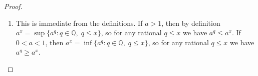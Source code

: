 \begin{proof}
\begin{enumerate}
    For $0 < a < 1$, write $a = (a^{-1})^{-1}$ and apply the previous case to base $a^{-1} > 1$:
    $$a^x = (a^{-1})^{-x} > (a^{-1})^{-y} = a^y$$
    since $-x > -y$ and base $a^{-1} > 1$.

    \item This is immediate from the definitions. If $a > 1$, then by definition $a^x = \sup\{a^q : q \in \mathbb{Q},\; q \leq x\}$, so for any rational $q \leq x$ we have $a^q \leq a^x$. If $0 < a < 1$, then $a^x = \inf\{a^q : q \in \mathbb{Q},\; q \leq x\}$, so for any rational $q \leq x$ we have $a^q \geq a^x$.
\end{enumerate}
\end{proof}
